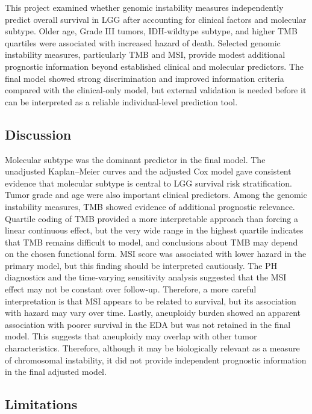 \documentclass[paper=a4, fontsize=11pt]{scrartcl}
\numberwithin{equation}{section}		%
\numberwithin{figure}{section}			%
\numberwithin{table}{section}				%
\begin{document}
This project examined whether genomic instability measures independently predict overall survival in LGG after accounting for clinical factors and molecular subtype. Older age, Grade III tumors, IDH-wildtype subtype, and higher TMB quartiles were associated with increased hazard of death. Selected genomic instability measures, particularly TMB and MSI, provide modest additional prognostic information beyond established clinical and molecular predictors. The final model showed strong discrimination and improved information criteria compared with the clinical-only model, but external validation is needed before it can be interpreted as a reliable individual-level prediction tool.

\subsection{Discussion}

Molecular subtype was the dominant predictor in the final model. The unadjusted Kaplan--Meier curves and the adjusted Cox model gave consistent evidence that molecular subtype is central to LGG survival risk stratification. Tumor grade and age were also important clinical predictors. Among the genomic instability measures, TMB showed evidence of additional prognostic relevance. Quartile coding of TMB provided a more interpretable approach than forcing a linear continuous effect, but the very wide range in the highest quartile indicates that TMB remains difficult to model, and conclusions about TMB may depend on the chosen functional form. MSI score was associated with lower hazard in the primary model, but this finding should be interpreted cautiously. The PH diagnostics and the time-varying sensitivity analysis suggested that the MSI effect may not be constant over follow-up. Therefore, a more careful interpretation is that MSI appears to be related to survival, but its association with hazard may vary over time. Lastly, aneuploidy burden showed an apparent association with poorer survival in the EDA but was not retained in the final model. This suggests that aneuploidy may overlap with other tumor characteristics. Therefore, although it may be biologically relevant as a measure of chromosomal instability, it did not provide independent prognostic information in the final adjusted model.

\subsection{Limitations}
\end{document}
